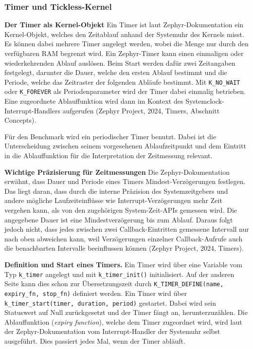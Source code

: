 \subsubsection{Timer und Tickless-Kernel}
\textbf{Der Timer als Kernel-Objekt }Ein Timer ist laut Zephyr-Dokumentation ein Kernel-Objekt, welches den Zeitablauf anhand der Systemuhr des Kernels misst. Es k{\"o}nnen dabei mehrere Timer angelegt werden, wobei die Menge nur durch den verf{\"u}gbaren RAM begrenzt wird. Ein Zephyr-Timer kann einen einmaligen oder wiederkehrenden Ablauf ausl{\"o}sen. Beim Start werden daf{\"u}r zwei Zeitangaben festgelegt, darunter die Dauer, welche den ersten Ablauf bestimmt und die Periode, welche das Zeitraster der folgenden Abl{\"a}ufe bestimmt. Mit \lstinline[style=fileinline]|K_NO_WAIT| oder \lstinline[style=fileinline]|K_FOREVER| als Periodenparameter wird der Timer dabei einmalig betrieben. Eine zugeordnete Ablauffunktion wird dann im Kontext des Systemclock-Interrupt-Handlers aufgerufen (Zephyr Project, 2024, \glqq{}Timers\grqq{}, Abschnitt \glqq{}Concepts\grqq{}).

F{\"u}r den Benchmark wird ein periodischer Timer benutzt. Dabei ist die Unterscheidung zwischen seinem vorgesehenen Ablaufzeitpunkt und dem Eintritt in die Ablauffunktion f{\"u}r die Interpretation der Zeitmessung relevant.

\textbf{Wichtige Pr{\"a}zisierung f{\"u}r Zeitmessungen }Die Zephyr-Dokumentation erw{\"a}hnt, dass Dauer und Periode eines Timers Mindest-Verz{\"o}gerungen festlegen. Das liegt daran, dass durch die interne Pr{\"a}zision des Systemzeitgebers und andere m{\"o}gliche Laufzeiteinfl{\"u}sse wie Interrupt-Verz{\"o}gerungen mehr Zeit vergehen kann, als von den zugeh{\"o}rigen System-Zeit-APIs gemessen wird. Die angegebene Dauer ist eine Mindestverz{\"o}gerung bis zum Ablauf. Daraus folgt jedoch nicht, dass jedes zwischen zwei Callback-Eintritten gemessene Intervall nur nach oben abweichen kann, weil Verz{\"o}gerungen einzelner Callback-Aufrufe auch die benachbarten Intervalle beeinflussen k{\"o}nnen (Zephyr Project, 2024, \glqq{}Timers\grqq{}).

\textbf{Definition und Start eines Timers.} Ein Timer wird {\"u}ber eine Variable vom Typ \lstinline[style=fileinline]|k_timer| angelegt und mit \lstinline[style=fileinline]|k_timer_init()| initialisiert. Auf der anderen Seite kann dies schon zur {\"U}bersetzungszeit durch \lstinline[style=fileinline]|K_TIMER_DEFINE(name, expiry_fn, stop_fn)| definiert werden. Ein Timer wird {\"u}ber \lstinline[style=fileinline]|k_timer_start(timer, duration, period)| gestartet. Dabei wird sein Statuswert auf Null zur{\"u}ckgesetzt und der Timer f{\"a}ngt an, herunterzuz{\"a}hlen. Die Ablauffunktion (\emph{expiry function}), welche dem Timer zugeordnet wird, wird laut der Zephyr-Dokumentation vom Interrupt-Handler der Systemuhr selbst ausgef{\"u}hrt. Dies passiert jedes Mal, wenn der Timer abl{\"a}uft.

